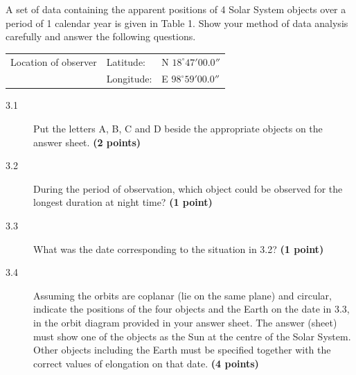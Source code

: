 A set of data containing the apparent positions of 4 Solar System objects
over a period of 1 calendar year is given in Table 1. Show your method of
data analysis carefully and answer the following questions.

\begin{center}
\begin{tabular}{lll}
Location of observer & Latitude: & N $18^\circ 47' 00.0''$ \\
 & Longitude: & E $98^\circ 59' 00.0''$ \\
\end{tabular}
\end{center}


\begin{description}
\item[3.1] Put the letters A, B, C and D beside the appropriate objects on
  the answer sheet. \textbf{(2 points)}
\item[3.2] During the period of observation, which object could be observed
  for the longest duration at night time? \textbf{(1 point)}
\item[3.3] What was the date corresponding to the situation in 3.2?
  \textbf{(1 point)}
\item[3.4] Assuming the orbits are coplanar (lie on the same plane) and
  circular, indicate the positions of the four objects and the Earth on the
  date in 3.3, in the orbit diagram provided in your answer sheet. The answer
  (sheet) must show one of the objects as the Sun at the centre of the Solar
  System. Other objects including the Earth must be specified together with
  the correct values of elongation on that date. \textbf{(4 points)}
\end{description}
